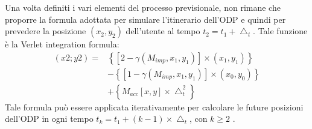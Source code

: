 Una volta definiti i vari elementi del processo previsionale, non rimane che
proporre la formula adottata per simulare l'itinerario dell'ODP e quindi per
prevedere la posizione $(x_{2},y_{2})$ dell'utente al tempo $t_{2} = t_{1} +\bigtriangleup_{t}$.
Tale funzione \`e la Verlet integration formula:
\begin{equation}
\begin{matrix}
(x2; y2) = & \left \{ [2 - \gamma(M_{imp},x_{1},y_{1})] \times (x_{1},y_{1}) \right \}\\
 & - \left \{ [1 - \gamma(M_{imp},x_{1},y_{1})] \times (x_{0},y_{0}) \right \} \\
 & + \left \{ M_{acc}[x,y] \times \bigtriangleup_{t}^{2} \right \}
\end{matrix}
\end{equation}
Tale formula pu\`o essere applicata iterativamente per calcolare le future
posizioni dell'ODP in ogni tempo $t_{k} = t_{1} + (k - 1) \times \bigtriangleup_{t}$, con $k \geq 2$ .

